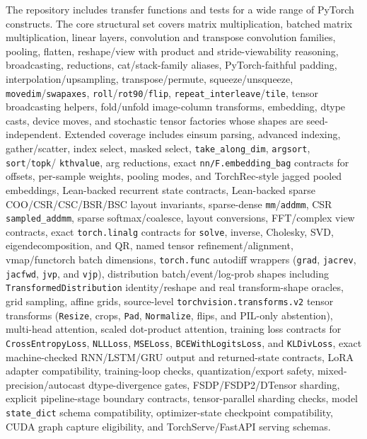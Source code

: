 \documentclass[11pt]{article}
\begin{document}
The repository includes transfer functions and tests for a wide range of
PyTorch constructs.  The core structural set covers matrix multiplication,
batched matrix multiplication, linear layers, convolution and transpose
convolution families, pooling, flatten, reshape/view with product and
stride-viewability reasoning,
broadcasting, reductions, cat/stack-family aliases, PyTorch-faithful padding,
interpolation/upsampling, transpose/permute, squeeze/unsqueeze,
\texttt{movedim}/\texttt{swapaxes}, \texttt{roll}/\texttt{rot90}/\texttt{flip},
\texttt{repeat\_interleave}/\texttt{tile}, tensor broadcasting helpers,
fold/unfold image-column transforms,
embedding, dtype casts, device moves, and stochastic tensor factories whose
shapes are seed-independent.  Extended coverage includes einsum parsing,
advanced indexing, gather/scatter, index select, masked select,
\texttt{take\_along\_dim}, \texttt{argsort}, \texttt{sort}/\texttt{topk}/
\texttt{kthvalue}, arg reductions, exact \texttt{nn/F.embedding\_bag}
contracts for offsets, per-sample weights, pooling modes, and TorchRec-style
jagged pooled embeddings, Lean-backed recurrent state contracts,
Lean-backed sparse COO/CSR/CSC/BSR/BSC layout invariants,
sparse-dense \texttt{mm}/\texttt{addmm}, CSR \texttt{sampled\_addmm},
sparse softmax/coalesce, layout conversions, FFT/complex view contracts, exact \texttt{torch.linalg} contracts for
\texttt{solve}, inverse, Cholesky, SVD, eigendecomposition, and QR, named tensor
refinement/alignment, vmap/functorch batch dimensions, \texttt{torch.func} autodiff
wrappers (\texttt{grad}, \texttt{jacrev}, \texttt{jacfwd}, \texttt{jvp}, and
\texttt{vjp}), distribution batch/event/log-prob shapes including
\texttt{TransformedDistribution} identity/reshape and real transform-shape
oracles, grid sampling, affine grids, source-level
\texttt{torchvision.transforms.v2} tensor transforms
(\texttt{Resize}, crops, \texttt{Pad}, \texttt{Normalize}, flips, and
PIL-only abstention), multi-head attention, scaled dot-product
attention, training loss contracts for \texttt{CrossEntropyLoss},
\texttt{NLLLoss}, \texttt{MSELoss}, \texttt{BCEWithLogitsLoss}, and
\texttt{KLDivLoss}, exact machine-checked RNN/LSTM/GRU output and returned-state contracts,
LoRA adapter compatibility, training-loop checks, quantization/export safety,
mixed-precision/autocast dtype-divergence gates, FSDP/FSDP2/DTensor sharding,
explicit pipeline-stage boundary contracts, tensor-parallel sharding checks,
model \texttt{state\_dict} schema compatibility, optimizer-state checkpoint
compatibility, CUDA graph capture eligibility, and TorchServe/FastAPI serving schemas.
\end{document}
